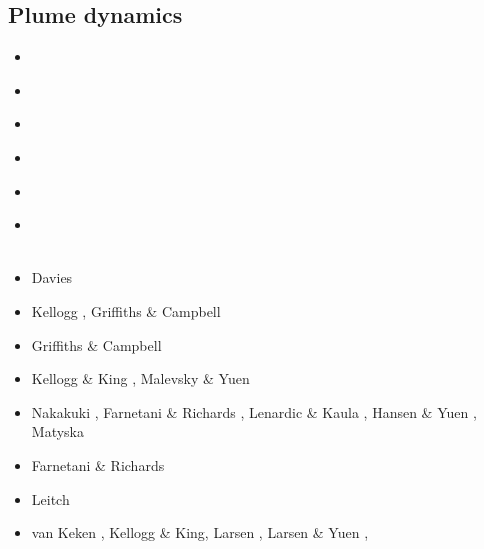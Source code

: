 \subsection{Plume dynamics}

\begin{scriptsize}
\begin{itemize}
\item[\nineteenseventyone] 
\textcite{morg71} \\
\item[\nineteenseventythree] 
\textcite{toze73} \\
\item[\nineteenseventyfive] 
\textcite{patt75} \\ 
\item[\nineteenseventyseven] 
\textcite{hovo77}\\
\item[\nineteeneighty] 
\textcite{yupe80} \\
\item[\nineteeneightyseven] 
\textcite{zhyu87} \\
\textcite{rism87} \\
\item[\nineteenninety] Davies \cite{davi90}
\item[\nineteenninetyone] Kellogg \cite{kell91}, Griffiths \& Campbell \cite{grca91b}
\item[\nineteenninety] Griffiths \& Campbell \cite{grca90}
\item[\nineteenninetythree] Kellogg \& King \cite{keki93}, Malevsky \& Yuen \cite{mayu93}
\item[\nineteenninetyfour] Nakakuki \etal \cite{nasf94}, Farnetani \& Richards \cite{fari94},
                           Lenardic \& Kaula \cite{leka94b}, Hansen \& Yuen \cite{hayu94},
                           Matyska \etal \cite{mamy94}
\item[\nineteenninetyfive] Farnetani \& Richards \cite{fari95}
\item[\nineteenninetysix] Leitch \etal \cite{lesy96} 
\item[\nineteenninetyseven] van Keken \cite{vank97}, Kellogg \& King\cite{keki97},
                            Larsen \etal \cite{laym97}, Larsen \& Yuen \cite{layu97,layu97b},

\end{itemize}
\end{scriptsize}
